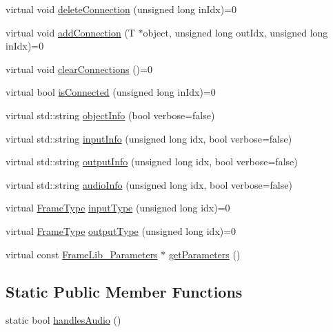 \begin{DoxyCompactItemize}
virtual void \hyperlink{class_frame_lib___object_a4ed6892941c7b68c885b38c202f336b3}{delete\+Connection} (unsigned long in\+Idx)=0
\item 
virtual void \hyperlink{class_frame_lib___object_ab276c500466359bb43494ff2b7c94cc6}{add\+Connection} (T $\ast$object, unsigned long out\+Idx, unsigned long in\+Idx)=0
\item 
virtual void \hyperlink{class_frame_lib___object_a5b219c0cb96a7b6b1f0c471f665337ec}{clear\+Connections} ()=0
\item 
virtual bool \hyperlink{class_frame_lib___object_a773123ebc7b3571e607cb1a6c4296d20}{is\+Connected} (unsigned long in\+Idx)=0
\item 
virtual std\+::string \hyperlink{class_frame_lib___object_a10d673de9a3c59ace6a22ba1cff313c8}{object\+Info} (bool verbose=false)
\item 
virtual std\+::string \hyperlink{class_frame_lib___object_a49abea5f18125c425b1eae8710735891}{input\+Info} (unsigned long idx, bool verbose=false)
\item 
virtual std\+::string \hyperlink{class_frame_lib___object_a6e6d79e8d620eedbaa50abf324cdedf5}{output\+Info} (unsigned long idx, bool verbose=false)
\item 
virtual std\+::string \hyperlink{class_frame_lib___object_af618fcdec82b457911147c7c293bedd7}{audio\+Info} (unsigned long idx, bool verbose=false)
\item 
virtual \hyperlink{_frame_lib___types_8h_ad495a9f61af7fff07d7e97979d1ab854}{Frame\+Type} \hyperlink{class_frame_lib___object_a6c5d94f1577471d33204078e86f51ff3}{input\+Type} (unsigned long idx)=0
\item 
virtual \hyperlink{_frame_lib___types_8h_ad495a9f61af7fff07d7e97979d1ab854}{Frame\+Type} \hyperlink{class_frame_lib___object_abdfca6b259f5fc7f97f4f2e016c1d80f}{output\+Type} (unsigned long idx)=0
\item 
virtual const \hyperlink{class_frame_lib___parameters}{Frame\+Lib\+\_\+\+Parameters} $\ast$ \hyperlink{class_frame_lib___object_aaebb53211e0617e9203d1088c2fcb9c2}{get\+Parameters} ()
\end{DoxyCompactItemize}
\subsection*{Static Public Member Functions}
\begin{DoxyCompactItemize}
\item 
static bool \hyperlink{class_frame_lib___object_a3d8517596d7598585c08af375dae79b9}{handles\+Audio} ()
\end{DoxyCompactItemize}
